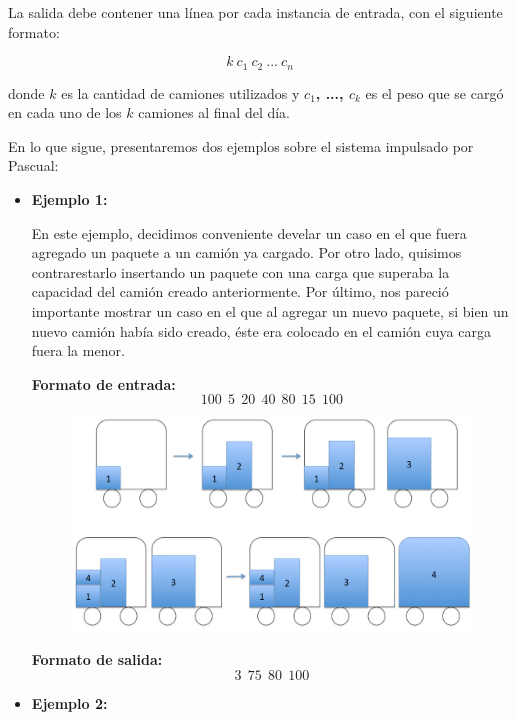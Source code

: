 La salida debe contener una línea por cada instancia de entrada, con el siguiente formato:

$$k\ c_{1}\ c_{2}\ ...\ c_{n}$$


donde \textbf{$k$} es la cantidad de camiones utilizados y \textbf{$c_{1}$, ..., $c_{k}$} es el peso que se cargó en cada uno de los \textbf{$k$} camiones al final del día.\newline

En lo que sigue, presentaremos dos ejemplos sobre el sistema impulsado por Pascual:
\begin{itemize}
\item {\large{\textbf{Ejemplo 1:}}}\newline

En este ejemplo, decidimos conveniente develar un caso en el que fuera agregado un paquete a un camión ya cargado. Por otro lado, quisimos contrarestarlo insertando un paquete con una carga que superaba la capacidad del camión creado anteriormente. Por último, nos pareció importante mostrar un caso en el que al agregar un nuevo paquete, si bien un nuevo camión había sido creado, éste era colocado en el camión cuya carga fuera la menor.\newline

\textbf{Formato de entrada:}
$$100\ \ 5\ \ 20\ \ 40\ \ 80\ \ 15\ \ 100$$

\begin{figure}[H] %
\begin{center}
\includegraphics[width=320pt]{../imgs/ejemplo1.jpg}
\end{center}
\end{figure}

\textbf{Formato de salida:}
$$3\ \ 75\ \ 80\ \ 100$$


\item {\large{\textbf{Ejemplo 2:}}}\newline


\end{itemize}
